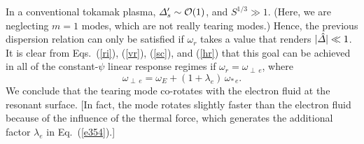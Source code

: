 \documentclass[12pt,prb,aps]{revtex4-1}
\begin{document}
In a conventional tokamak plasma, ${\mit\Delta}_s' \sim {\cal O}(1)$, and $S^{1/3}\gg 1$. (Here, we are neglecting $m=1$ modes, which
are not really tearing modes.)
Hence, the previous dispersion relation can only be satisfied if $\omega_r$ takes a
value that renders $|\hat{\mit\Delta}|\ll 1$. It is clear from Eqs.~(\ref{ri}), (\ref{vr}), (\ref{sc}), and (\ref{hr}) that this goal
can be achieved in all of the constant-$\psi$ linear response regimes if
$\omega_r = \omega_{\perp\,e}$, where
\begin{equation}\label{e354}
\omega_{\perp\,e} = \omega_E+(1+\lambda_e)\,\omega_{\ast\,e}.
\end{equation}
We conclude that the tearing mode co-rotates with the electron fluid at the resonant
 surface.\cite{ara} [In fact, the mode 
rotates slightly faster than the electron fluid because of the influence of the thermal force, 
which generates the additional  factor $\lambda_e$ in Eq.~(\ref{e354}).]
\end{document}
